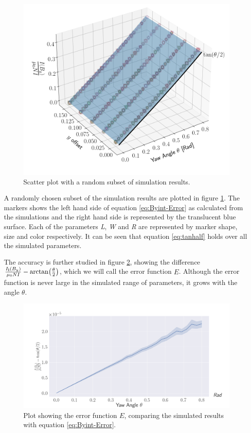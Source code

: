 \begin{figure}[h!]
    \centering
    \includegraphics[width=0.8\linewidth]{figs/ByInt3D}
    \caption{Scatter plot with a random subset of simulation results.}
    \label{fig:ByInt3D}
\end{figure}



A randomly chosen subset of the simulation results are plotted in figure \ref{fig:ByInt3D}.
The markers shows the left hand side of equation \ref{eq:Byint-Error} 
as calculated from the simulations and the right hand side is represented by the translucent
blue surface.
Each of the parameters \emph{L}, \emph{W} and \emph{R} are represented
by marker shape, size and color respectively. It can be seen that
equation \ref{eq:tanhalf} holds over all the simulated parameters.

The accuracy is further studied in figure \ref{fig:ByInt-Error},
showing the difference \newline
$\frac{I_{\vb{l}}(B_y)}{\mu_0NI} - \arctan(\frac{\theta}{2})$, which
we will call the error function $E$. Although the error function
is never large in the simulated range of parameters,
it grows with the angle $\theta$.

\begin{figure}[h!]
    \centering
    \includegraphics[width=\linewidth]{figs/ByIntError}
    \caption{Plot showing the error function $E$, comparing the simulated results
    with equation \ref{eq:Byint-Error}.}
    \label{fig:ByInt-Error}
\end{figure}


